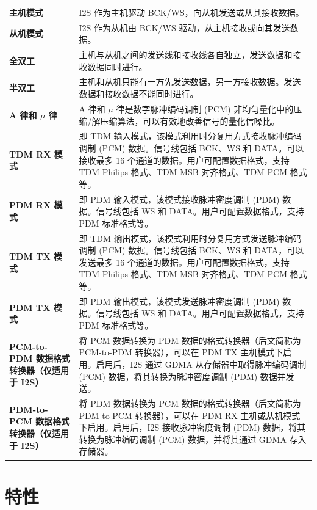\documentclass[main\_\_CN.tex]{subfiles}
\begin{document}
\begin{longtable}[c]{ R{4cm} p{10cm} }

\textbf{主机模式}     & I2S 作为主机驱动 BCK/WS，向从机发送或从其接收数据。 \\ 
\textbf{从机模式}      & I2S 作为从机由 BCK/WS 驱动，从主机接收或向其发送数据。 \\
\textbf{全双工} & 主机与从机之间的发送线和接收线各自独立，发送数据和接收数据同时进行。\\
\textbf{半双工} & 主机和从机只能有一方先发送数据，另一方接收数据。发送数据和接收数据不能同时进行。 \\
\textbf{A 律和 $\mu$ 律} & A 律和 \textrm{$\mu$} 律是数字脉冲编码调制 (PCM) 非均匀量化中的压缩/解压缩算法，可以有效地改善信号的量化信噪比。 \\
\textbf{TDM RX 模式} & 即 TDM 输入模式，该模式利用时分复用方式接收脉冲编码调制 (PCM) 数据。信号线包括 BCK、WS 和 DATA。可以接收最多 16 个通道的数据。用户可配置数据格式，支持 TDM Philips 格式、TDM MSB 对齐格式、TDM PCM 格式等。\\
\textbf{PDM RX 模式} & 即 PDM 输入模式，该模式接收脉冲密度调制 (PDM) 数据。信号线包括 WS 和 DATA。用户可配置数据格式，支持 PDM 标准格式等。\\
\textbf{TDM TX 模式} & 即 TDM 输出模式，该模式利用时分复用方式发送脉冲编码调制 (PCM) 数据。信号线包括 BCK、WS 和 DATA，可以发送最多 16 个通道的数据。用户可配置数据格式，支持 TDM Philips 格式、TDM MSB 对齐格式、TDM PCM 格式等。\\
\textbf{PDM TX 模式} & 即 PDM 输出模式，该模式发送脉冲密度调制 (PDM) 数据。信号线包括 WS 和 DATA。用户可配置数据格式，支持 PDM 标准格式等。\\
\textbf{PCM-to-PDM 数据格式转换器（仅适用于 I2S）} & 将 PCM 数据转换为 PDM 数据的格式转换器（后文简称为 PCM-to-PDM 转换器），可以在 PDM TX 主机模式下启用。启用后，I2S 通过 GDMA 从存储器中取得脉冲编码调制 (PCM) 数据，将其转换为脉冲密度调制 (PDM) 数据并发送。\\
\textbf{PDM-to-PCM 数据格式转换器（仅适用于 I2S）} & 将 PDM 数据转换为 PCM 数据的格式转换器（后文简称为 PDM-to-PCM 转换器），可以在 PDM RX 主机或从机模式下启用。启用后，I2S 接收脉冲密度调制 (PDM) 数据，将其转换为脉冲编码调制 (PCM) 数据，并将其通过 GDMA 存入存储器。\\
\end{longtable}

\section{特性}
\end{document}
